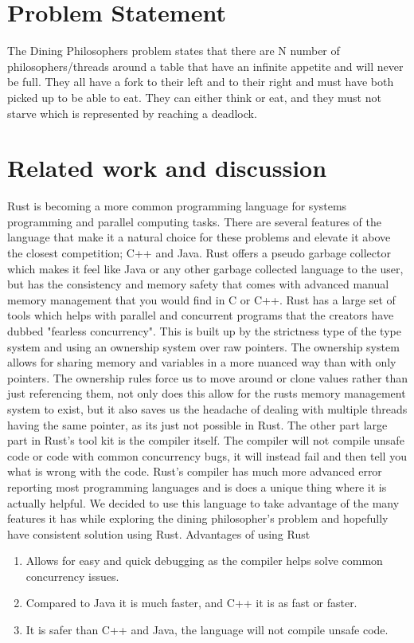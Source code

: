 \documentclass[conference]{IEEEtran}
\begin{document}
	\section{Problem Statement}
	The Dining Philosophers problem states that there are N number of philosophers/threads around a table that have an infinite appetite and will never be full. They all have a fork to their left and to their right and must have both picked up to be able to eat. They can either think or eat, and they must not starve which is represented by reaching a deadlock.
	\section{Related work and discussion}
	Rust is becoming a more common programming language for systems programming and parallel computing tasks. There are several features of the language that make it a natural choice for these problems and elevate it above the closest competition; C++ and Java. Rust offers a pseudo garbage collector which makes it feel like Java or any other garbage collected language to the user, but has the consistency and memory safety that comes with advanced manual memory management that you would find in C or C++. Rust has a large set of tools which helps with parallel and concurrent programs that the creators have dubbed "fearless concurrency". This is built up by the strictness type of the type system and using an ownership system over raw pointers. The ownership system allows for sharing memory and variables in a more nuanced way than with only pointers. The ownership rules force us to move around or clone values rather than just referencing them, not only does this allow for the rusts memory management system to exist, but it also saves us the headache of dealing with multiple threads having the same pointer, as its just not possible in Rust. The other part large part in Rust's tool kit is the compiler itself. The compiler will not compile unsafe code or code with common concurrency bugs, it will instead fail and then tell you what is wrong with the code. Rust's compiler has much more advanced error reporting most programming languages and is does a unique thing where it is actually helpful. We decided to use this language to take advantage of the many features it has while exploring the dining philosopher's problem and hopefully have consistent solution using Rust.
	\linebreak
	Advantages of using Rust
	\begin{enumerate}
		\item Allows for easy and quick debugging as the compiler helps solve common concurrency issues.
		\item Compared to Java it is much faster, and C++ it is as fast or faster.
		\item It is safer than C++ and Java, the language will not compile unsafe code.
	\end{enumerate}
\end{document}
